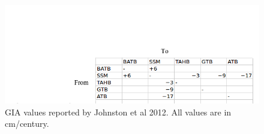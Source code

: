  \begin{figure}[t]
	\includegraphics[width=0.9\linewidth]{jjGrid.png}
	\caption{GIA values reported by Johnston et al 2012. All values are in cm/century.}
	\label{fig:jj2012Grid}
 \end{figure}
 
